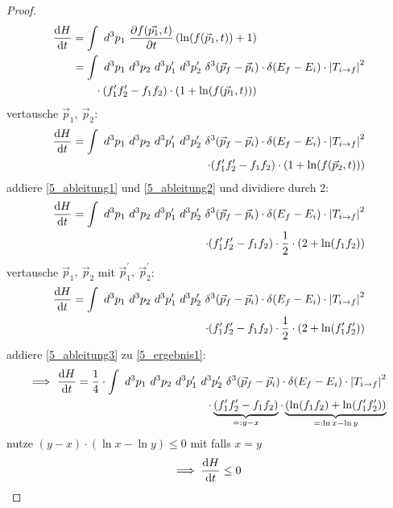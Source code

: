 \begin{proof}
\begin{align}\label{5_ableitung1}
    \dv{H}{t}&= \int \ d^3p_1 \ \pdv{f(\Vec{p_1},t)}{t} \left( \ln(f(\Vec{p}_1,t)) + 1\right)\\
    &= \int \ d^3p_1 \ d^3p_2 \ d^3p_1^\prime \ d^3p_2^\prime \ \delta^3(\Vec{p}_f-\Vec{p}_i)\cdot \delta(E_f-E_i)\cdot \abs{T_{i\rightarrow f}}^2 \\
    &\qquad \cdot (f_1^\prime f_2^\prime-f_1 f_2)\cdot (1+\ln(f(\Vec{p}_1,t)))
\end{align}
vertausche $\Vec{p}_1, \ \Vec{p}_2$:
\begin{align}\label{5_ableitung2}
    \dv{H}{t} = \int \ d^3p_1 \ d^3p_2 \ d^3p_1^\prime \ d^3p_2^\prime \ \delta^3(\Vec{p}_f-\Vec{p}_i)\cdot \delta(E_f-E_i)\cdot \abs{T_{i\rightarrow f}}^2 \\
    \qquad \cdot (f_1^\prime f_2^\prime-f_1 f_2)\cdot (1+\ln(f(\Vec{p}_2,t)))
\end{align}
addiere \cref{5_ableitung1} und \cref{5_ableitung2} und dividiere durch 2:
\begin{align}\label{5_ergebnis1}
    \dv{H}{t} = \int \ d^3p_1 \ d^3p_2 \ d^3p_1^\prime \ d^3p_2^\prime \ \delta^3(\Vec{p}_f-\Vec{p}_i)\cdot \delta(E_f-E_i)\cdot \abs{T_{i\rightarrow f}}^2 \\
    \qquad \cdot (f_1^\prime f_2^\prime-f_1 f_2)\cdot \frac{1}{2} \cdot (2+\ln(f_1f_2))
\end{align}
vertausche $\Vec{p}_1, \ \Vec{p}_2$ mit $\Vec{p}_1^\prime, \ \Vec{p}_2^\prime$:
\begin{align}\label{5_ableitung3}
    \dv{H}{t} = \int \ d^3p_1 \ d^3p_2 \ d^3p_1^\prime \ d^3p_2^\prime \ \delta^3(\Vec{p}_f-\Vec{p}_i)\cdot \delta(E_f-E_i)\cdot \abs{T_{i\rightarrow f}}^2 \\
    \qquad \cdot (f_1^\prime f_2^\prime-f_1 f_2)\cdot \frac{1}{2} \cdot (2+\ln(f_1^\prime f_2^\prime))
\end{align}
addiere \cref{5_ableitung3} zu \cref{5_ergebnis1}:
\begin{align}
    \Longrightarrow \ \dv{H}{t} = \frac{1}{4}\cdot \int \ d^3p_1 \ d^3p_2 \ d^3p_1^\prime \ d^3p_2^\prime \ \delta^3(\Vec{p}_f-\Vec{p}_i)\cdot \delta(E_f-E_i)\cdot \abs{T_{i\rightarrow f}}^2 \\
    \qquad \cdot \underbrace{(f_1^\prime f_2^\prime-f_1 f_2)}_{=: y-x} \cdot \underbrace{(\ln(f_1 f_2)+\ln(f_1^\prime f_2^\prime))}_{=: \ln x -\ln y}
\end{align}
nutze $(y-x)\cdot (\ln x -\ln y) \leq 0$ mit \say{=} falls $x=y$
\begin{equation}
    \Longrightarrow \; \dv{H}{t} \leq 0
\end{equation}
\end{proof}

